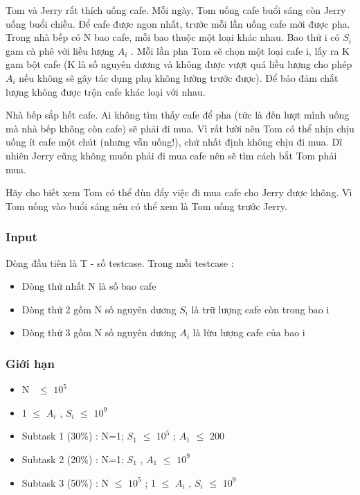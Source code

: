 

Tom và Jerry rất thích uống cafe. Mỗi ngày, Tom uống cafe buổi sáng còn Jerry uống buổi chiều. Để cafe được ngon nhất, trước mỗi lần uống cafe mới được pha. Trong nhà bếp có N bao cafe, mỗi bao thuộc một loại khác nhau. Bao thứ i có $S_{i}$ gam cà phê với liều lượng $A_{i}$ . Mỗi lần pha Tom sẽ chọn một loại cafe i, lấy ra K gam bột cafe (K là số nguyên dương và không được vượt quá liều lượng cho phép $A_{i}$ nếu không sẽ gây tác dụng phụ không lường trước được). Để bảo đảm chất lượng không được trộn cafe khác loại với nhau.

Nhà bếp sắp hết cafe. Ai không tìm thấy cafe để pha (tức là đến lượt mình uống mà nhà bếp không còn cafe) sẽ phải đi mua. Vì rất lười nên Tom có thể nhịn chịu uống ít cafe một chút (nhưng vẫn uống!), chứ nhất định không chịu đi mua. Dĩ nhiên Jerry cũng không muốn phải đi mua cafe nên sẽ tìm cách bắt Tom phải mua.

Hãy cho biết xem Tom có thể đùn đẩy việc đi mua cafe cho Jerry được không. Vì Tom uống vào buổi sáng nên có thể xem là Tom uống trước Jerry.

\subsubsection{Input}

Dòng đầu tiên là T - số testcase. Trong mỗi testcase :
\begin{itemize}
	\item Dòng thứ nhất N là số bao cafe
	\item Dòng thứ 2 gồm N số nguyên dương $S_{i}$ là trữ lượng cafe còn trong bao i
	\item Dòng thứ 3 gồm N số nguyên dương $A_{i}$ là lừu lượng cafe của bao i
\end{itemize}

\subsubsection{Giới hạn}
\begin{itemize}
	\item N  $\le$  $10^{5}$
	\item 1  $\le$  $A_{i}$ , $S_{i}$  $\le$  $10^{9}$
	\item Subtask 1 (30\%) : N=1; $S_{1}$  $\le$  $10^{5}$ ; $A_{1}$  $\le$  200
	\item Subtask 2 (20\%) : N=1; $S_{1}$ , $A_{1}$  $\le$  $10^{9}$
	\item Subtask 3 (50\%) : N  $\le$  $10^{5}$ ; 1  $\le$  $A_{i}$ , $S_{i}$  $\le$  $10^{9}$
\end{itemize}

